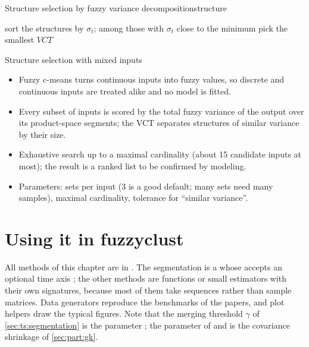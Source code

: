 \begin{algobox}{Structure selection by fuzzy variance decomposition}{structure}
\begin{algorithm}[H]
sort the structures by $\sigma_t$; among those with $\sigma_t$ close to the minimum pick the smallest $VCT$\;
\end{algorithm}
\end{algobox}
\begin{summarybox}{Structure selection with mixed inputs}
\begin{itemize}
  \item Fuzzy c-means turns continuous inputs into fuzzy values, so discrete and continuous inputs are treated alike and no model is fitted.
  \item Every subset of inputs is scored by the total fuzzy variance of the output over its product-space segments; the VCT separates structures of similar variance by their size.
  \item Exhaustive search up to a maximal cardinality (about 15 candidate inputs at most); the result is a ranked list to be confirmed by modeling.
  \item Parameters: sets per input (3 is a good default; many sets need many samples), maximal cardinality, tolerance for ``similar variance''.
\end{itemize}
\end{summarybox}

\section{Using it in fuzzyclust}\label{sec:ts:api}

All methods of this chapter are in . The segmentation is a  whose  accepts an optional time axis ; the other methods are functions or small estimators with their own signatures, because most of them take sequences rather than sample matrices. Data generators reproduce the benchmarks of the papers, and plot helpers draw the typical figures. Note that the merging threshold $\gamma$ of \cref{sec:ts:segmentation} is the parameter ; the parameter  of  and  is the covariance shrinkage of \cref{sec:part:gk}.

